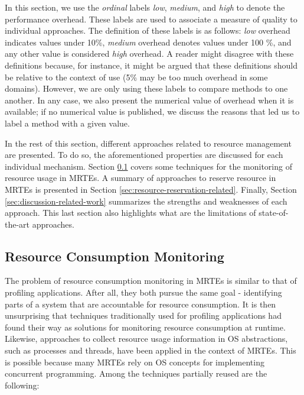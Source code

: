\begin{itemize}
In this section, we use the \textit{ordinal} labels \textit{low}, \textit{medium}, and \textit{high} to denote the performance overhead.
These labels are used to associate a measure of quality to individual approaches. 
The definition of these labels is as follows: \textit{low} overhead indicates values under 10\%, \textit{medium} overhead denotes values under 100 \%, and any other value is considered \textit{high} overhead.
A reader might disagree with these definitions because, for instance, it might be argued that these definitions should be relative to the context of use (5\% may be too much overhead in some domains).
However, we are only using these labels to compare methods to one another.
In any case, we also present the numerical value of overhead when it is available; if no numerical value is published, we discuss the reasons that led us to label a method with a given value.


\end{itemize}

In the rest of this section, different approaches related to resource management are presented.
To do so, the aforementioned properties are discussed for each individual mechanism.
Section \ref{sec:resource-consumption-monitoring-related} covers some techniques for the monitoring of resource usage in MRTEs.
A summary of approaches to reserve resource in MRTEs is presented in Section \ref{sec:resource-reservation-related}.
Finally, Section \ref{sec:discussion-related-work} summarizes the strengths and weaknesses of each approach.
This last section also highlights what are the limitations of state-of-the-art approaches.

\subsection{Resource Consumption Monitoring} \label{sec:resource-consumption-monitoring-related}

The problem of resource consumption monitoring in MRTEs is similar to that of profiling applications.
After all, they both pursue the same goal - identifying parts of a system that are accountable for resource consumption.
It is then unsurprising that techniques traditionally used for profiling applications had found their way as solutions for monitoring resource consumption at runtime.
Likewise, approaches to collect resource usage information in OS abstractions, such as processes and threads, have been applied in the context of MRTEs.
This is possible because many MRTEs rely on OS concepts for implementing concurrent programming.
Among the techniques partially reused are the following:

